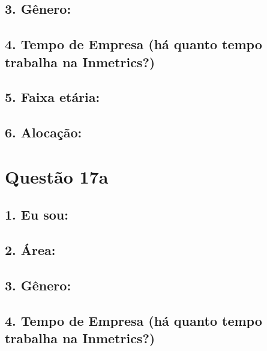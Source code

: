 \documentclass[]{book}
\begin{document}
\hypertarget{genero-34}{%
\subsection{3. Gênero:}\label{genero-34}}

\hypertarget{tempo-de-empresa-ha-quanto-tempo-trabalha-na-inmetrics-34}{%
\subsection{4. Tempo de Empresa (há quanto tempo trabalha na Inmetrics?)}\label{tempo-de-empresa-ha-quanto-tempo-trabalha-na-inmetrics-34}}

\hypertarget{faixa-etaria-34}{%
\subsection{5. Faixa etária:}\label{faixa-etaria-34}}

\hypertarget{alocacao-34}{%
\subsection{6. Alocação:}\label{alocacao-34}}

\hypertarget{questao-17a}{%
\section{Questão 17a}\label{questao-17a}}

\hypertarget{eu-sou-35}{%
\subsection{1. Eu sou:}\label{eu-sou-35}}

\hypertarget{area-35}{%
\subsection{2. Área:}\label{area-35}}

\hypertarget{genero-35}{%
\subsection{3. Gênero:}\label{genero-35}}

\hypertarget{tempo-de-empresa-ha-quanto-tempo-trabalha-na-inmetrics-35}{%
\subsection{4. Tempo de Empresa (há quanto tempo trabalha na Inmetrics?)}\label{tempo-de-empresa-ha-quanto-tempo-trabalha-na-inmetrics-35}}
\end{document}
